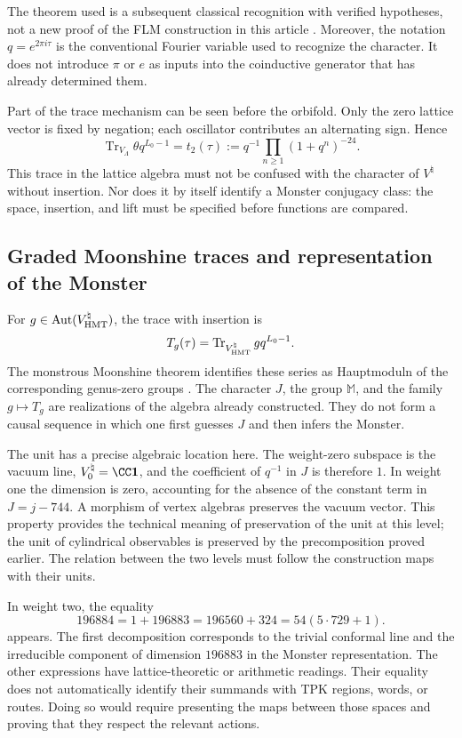 The theorem used is a subsequent classical recognition with verified
hypotheses, not a new proof of the FLM construction in this article
\cite{flm}.
Moreover, the notation $q=e^{2\pi i\tau}$ is the conventional Fourier
variable used to recognize the character. It does not introduce $\pi$
or $e$ as inputs into the coinductive generator that has already determined them.

Part of the trace mechanism can be seen before the orbifold.
Only the zero lattice vector is fixed by negation; each
oscillator contributes an alternating sign. Hence
\[
 \operatorname{Tr}_{V_\Lambda}\theta q^{L_0-1}
   =t_2(\tau)
   :=q^{-1}\prod_{n\geq1}(1+q^n)^{-24}.
\]
This trace in the lattice algebra must not be confused with the
character of $V^\natural$ without insertion. Nor does it by
itself identify a Monster conjugacy class: the space, insertion,
and lift must be specified before functions are compared.

\subsection{Graded Moonshine traces and representation of the Monster}
\label{exc:alcance}

For $g\in\operatorname{Aut}(V^\natural_{\rm HMT})$, the trace
with insertion is
\[
 T_g(\tau)=
 \operatorname{Tr}_{V^\natural_{\rm HMT}}gq^{L_0-1}.
\]
The monstrous Moonshine theorem identifies these series as
Hauptmoduln of the corresponding genus-zero groups
\cite[Theorem~1.1]{borcherds}.
The character $J$, the group $\mathbb M$, and the family $g\mapsto T_g$
are realizations of the algebra already constructed. They do not form a causal
sequence in which one first guesses $J$ and then infers the Monster.

The unit has a precise algebraic location here. The weight-zero
subspace is the vacuum line, \(V^\natural_0=\CC\mathbf1\), and
the coefficient of \(q^{-1}\) in \(J\) is therefore \(1\). In weight one
the dimension is zero, accounting for the absence of the constant term
in \(J=j-744\). A morphism of vertex algebras preserves the vacuum
vector. This property provides the technical meaning of preservation
of the unit at this level; the unit of cylindrical observables
is preserved by the precomposition proved earlier. The relation
between the two levels must follow the construction maps with their units.

In weight two, the equality
\[
 196884=1+196883=196560+324=54(5\cdot729+1).
\]
appears. The first decomposition corresponds to the trivial conformal line and the
irreducible component of dimension $196883$ in the Monster
representation. The other expressions have lattice-theoretic or
arithmetic readings. Their equality does not automatically identify their summands
with TPK regions, words, or routes. Doing so would require
presenting the maps between those spaces and proving that they respect the
relevant actions.

